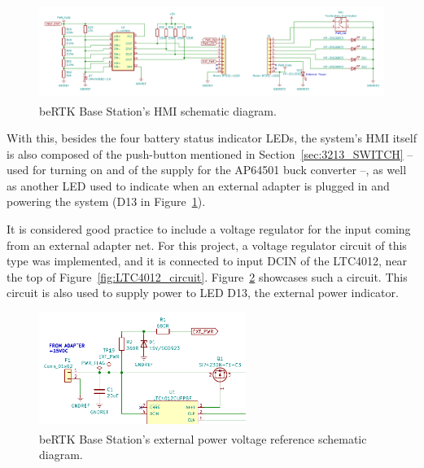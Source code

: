 \begin{figure}[h]
	\centering
	\includegraphics[width=1.0\textwidth]{Chapters/Figures/chapter3/Back_Panel.pdf}
	\caption{beRTK\textsuperscript{\textregistered} Base Station's HMI schematic diagram.}
	\label{fig:HMI_circuit}
\end{figure}

With this, besides the four battery status indicator LEDs, the system's HMI itself is also composed of the push-button mentioned in Section~\ref{sec:3213_SWITCH} -- used for turning on and of the supply for the AP64501 buck converter --, as well as another LED used to indicate when an external adapter is plugged in and powering the system (D13 in Figure~\ref{fig:HMI_circuit}).

It is considered good practice to include a voltage regulator for the input coming from an external adapter net. For this project, a voltage regulator circuit of this type was implemented, and it is connected to input DCIN of the LTC4012, near the top of Figure~\ref{fig:LTC4012_circuit}. Figure~\ref{fig:EXT_PWR} showcases such a circuit. This circuit is also used to supply power to LED D13, the external power indicator.

\begin{figure}[h]
	\centering
	\includegraphics[width=0.6\textwidth]{Chapters/Figures/chapter3/EXT_PWR.pdf}
	\caption{beRTK\textsuperscript{\textregistered} Base Station's external power voltage reference schematic diagram.}
	\label{fig:EXT_PWR}
\end{figure}

